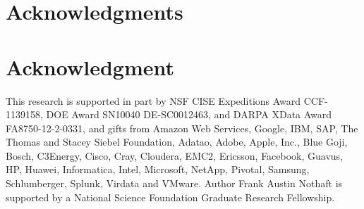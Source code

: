 \documentclass[10pt,journal,compsoc]{IEEEtran}
\begin{document}

%





\ifCLASSOPTIONcompsoc
  \section*{Acknowledgments}
\else
  \section*{Acknowledgment}
\fi

This research is supported in part by NSF CISE Expeditions Award CCF-1139158, DOE Award SN10040 DE-SC0012463, and DARPA XData Award FA8750-12-2-0331, and gifts from Amazon Web Services, Google, IBM, SAP, The Thomas and Stacey Siebel Foundation, Adatao, Adobe, Apple, Inc., Blue Goji, Bosch, C3Energy, Cisco, Cray, Cloudera, EMC2, Ericsson, Facebook, Guavus, HP, Huawei, Informatica, Intel, Microsoft, NetApp, Pivotal, Samsung, Schlumberger, Splunk, Virdata and VMware. Author Frank Austin Nothaft is supported by a National Science Foundation Graduate Research Fellowship.
\end{document}
